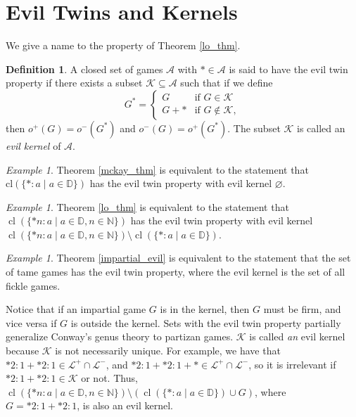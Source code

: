 \documentclass{amsart}
\theoremstyle{plain}
\theoremstyle{definition}
\newtheorem{defn}[thm]{Definition}
\theoremstyle{remark}
\newtheorem{ex}[thm]{Example}
\numberwithin{equation}{section}
\numberwithin{thm}{section}
\DeclareMathOperator{\cl}{cl}
\begin{document}
\section{Evil Twins and Kernels}
\label{3}

We give a name to the property of Theorem \ref{lo_thm}.

\begin{defn}
    A closed set of games $\mathscr{A}$ with $* \in \mathscr{A}$ is said to have the evil twin property if there exists a subset $\mathscr{K}  \subseteq \mathscr{A}$ such that if we define \begin{equation}
          G^* = \begin{cases}
            G & \text{if } G \in \mathscr{K} \\
            G+* & \text{if } G \notin \mathscr{K},
            \end{cases}
    \end{equation}
    then $o^+(G) = o^-(G^*)$ and $o^-(G) = o^+(G^*)$. The subset $\mathscr{K}$ is called an \emph{evil kernel} of $\mathscr{A}$. 
\end{defn}

\begin{ex}
    Theorem \ref{mckay_thm} is equivalent to the statement that $\text{cl}(\{*:a \mid a \in \mathbb{D}\})$ has the evil twin property with evil kernel $\varnothing$. 
\end{ex}

\begin{ex}
    \label{lo_example}
   Theorem \ref{lo_thm} is equivalent to the statement that  $\cl (\{*n:a \mid a \in \mathbb{D},n \in \mathbb{N}\})$ has the evil twin property with evil kernel $\cl (\{*n:a \mid a \in \mathbb{D},n \in \mathbb{N}\})\setminus \cl (\{*:a \mid a \in \mathbb{D}\})$.
\end{ex}
\begin{ex}
    Theorem \ref{impartial_evil} is equivalent to the statement that the set of tame games has the evil twin property, where the evil kernel is the set of all fickle games.
\end{ex}
Notice that if an impartial game $G$ is in the kernel, then $G$ must be firm, and vice versa if $G$ is outside the kernel. Sets with the evil twin property partially generalize Conway's genus theory to partizan games. $\mathscr{K}$ is called \emph{an} evil kernel because $\mathscr{K}$ is not necessarily unique. For example, we have that $*2:1 + *2:1 \in \mathcal{L}^+ \cap \mathcal{L}^-$, and $*2:1 + *2:1+* \in \mathcal{L}^+ \cap \mathcal{L}^-$, so it is irrelevant if $*2:1+*2:1 \in \mathscr{K}$ or not. Thus, $\cl (\{*n:a \mid a \in \mathbb{D},n \in \mathbb{N}\})\setminus (\cl (\{*:a \mid a \in \mathbb{D}\}) \cup G)$, where $G = *2:1+*2:1$, is also an evil kernel.
\end{document}
